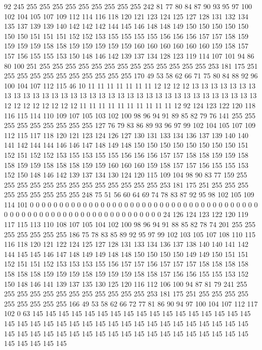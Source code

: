 92 245 255 255 255 255 255 255 255 255 255 242 81 77 80 84 87 90 93 95
97 100 102 104 105 107 109 112 114 116 118 120 121 123 124 125 127 128 131 132
134 135 137 139 139 140 142 142 142 144 145 146 148 148 149 150 150 150 150 150
150 150 151 151 151 152 152 153 155 155 155 155 156 156 156 157 157 158 159 159
159 159 158 158 159 159 159 159 159 160 160 160 160 160 160 159 158 157 157 156
155 155 153 150 148 146 142 139 137 134 128 123 119 114 107 101 94 86 80 100
251 255 255 255 255 255 255 255 255 255 255 255 255 255 253 181 175 251 255 255
255 255 255 255 255 255 255 255 170 49 53 58 62 66 71 75 80 84 88 92
96 100 104 107 112 115 46 10 11 11 11 11 11 11 11 12 12 12 12 13
13 13 13 13 13 13 13 13 13 13 13 13 13 13 13 13 13 13 13 13
13 13 13 13 13 13 13 13 13 13 13 13 13 12 12 12 12 12 12 12
12 11 11 11 11 11 11 11 11 11 11 12 92 124 123 122 120 118 116 115
114 110 109 107 105 103 102 100 98 96 94 91 89 85 82 79 76 141 255 255
255 255 255 255 255 255 255 127 76 79 83 86 89 93 96 97 99 102 104 105
107 109 112 115 117 118 120 121 123 124 126 127 130 131 133 134 136 137 139 140
140 141 142 144 144 146 146 147 148 149 148 150 150 150 150 150 150 150 150 151
152 151 152 152 153 155 153 155 155 156 156 156 157 157 158 158 159 159 158 158
159 159 158 158 158 159 159 160 160 160 159 158 157 157 156 155 155 153 152 150
148 146 142 139 137 134 130 124 120 115 109 104 98 90 83 77 159 255 255 255
255 255 255 255 255 255 255 255 255 255 253 181 175 251 255 255 255 255 255 255
255 255 255 248 75 51 56 60 64 69 74 78 83 87 92 95 98 102 105 109
114 101 0 0 0 0 0 0 0 0 0 0 0 0 0 0 0 0 0 0
0 0 0 0 0 0 0 0 0 0 0 0 0 0 0 0 0 0 0 0
0 0 0 0 0 0 0 0 0 0 0 0 0 0 0 0 0 0 0 0
0 0 0 0 0 0 0 0 24 126 124 123 122 120 119 117 115 113 110 108
107 105 104 102 100 98 96 94 91 88 85 82 78 74 201 255 255 255 255 255
255 255 186 75 78 83 85 89 92 95 97 99 102 103 105 107 108 110 115 116
118 120 121 122 124 125 127 128 131 133 134 136 137 138 140 140 141 142 144 145
145 146 147 148 149 149 148 148 150 150 150 150 149 149 150 151 151 152 151 151
152 153 153 153 155 156 157 157 156 157 157 157 158 158 158 158 158 158 158 159
159 159 158 159 159 159 158 158 157 156 156 155 155 153 152 150 148 146 141 139
137 135 130 125 120 116 112 106 100 94 87 81 79 241 255 255 255 255 255 255
255 255 255 255 255 255 253 181 175 251 255 255 255 255 255 255 255 255 255 166
49 53 58 62 66 72 77 81 86 90 94 97 100 104 107 112 117 102 0 63
145 145 145 145 145 145 145 145 145 145 145 145 145 145 145 145 145 145 145 145
145 145 145 145 145 145 145 145 145 145 145 145 145 145 145 145 145 145 145 145
145 145 145 145 145 145 145 145 145 145 145 145 145 145 145 145 145 145 145 145
